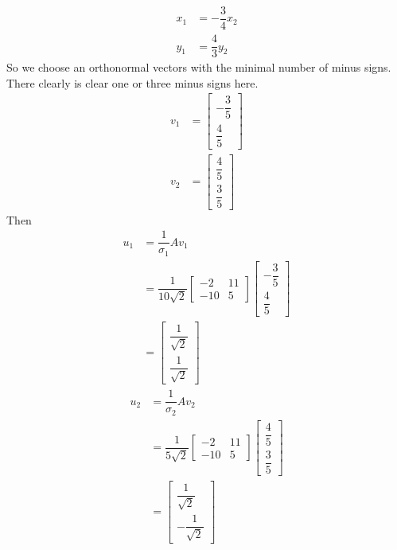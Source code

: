 \documentclass[a4paper,oneside]{book}
\numberwithin{equation}{chapter}
\begin{document}
\begin{enumerate}
\begin{align}
\label{1.7}
{x_1} &=  - \dfrac{3}{4}{x_2}\\
{y_1} &= \dfrac{4}{3}{y_2} \label{1.8}
\end{align}
So we choose an orthonormal vectors with the minimal number of minus signs. There clearly is clear one or three minus signs here.
\begin{align}
{v_1} &= \left[ {\begin{array}{*{20}{c}}
{ - \dfrac{3}{5}}\\
{\dfrac{4}{5}}
\end{array}} \right]\\
{v_2} &= \left[ {\begin{array}{*{20}{c}}
{\dfrac{4}{5}}\\
{\dfrac{3}{5}}
\end{array}} \right]
\end{align}
Then 
\begin{align}
{u_1} &= \dfrac{1}{{{\sigma _1}}}A{v_1}\\
& = \dfrac{1}{{{10 \sqrt 2}}}\left[ {\begin{array}{*{20}{c}}
{ - 2}&{11}\\
{ - 10}&5
\end{array}} \right]\left[ {\begin{array}{*{20}{c}}
{ - \dfrac{3}{5}}\\
{\dfrac{4}{5}}
\end{array}} \right]\\
 &= \left[ {\begin{array}{*{20}{c}}
{\dfrac{1}{{\sqrt 2 }}}\\
{\dfrac{1}{{\sqrt 2 }}}
\end{array}} \right]
\end{align}
\begin{align}
{u_2} &= \dfrac{1}{{{\sigma _2}}}A{v_2}\\
 &= \dfrac{1}{{{5 \sqrt 2}}}\left[ {\begin{array}{*{20}{c}}
{ - 2}&{11}\\
{ - 10}&5
\end{array}} \right]\left[ {\begin{array}{*{20}{c}}
{\dfrac{4}{5}}\\
{\dfrac{3}{5}}
\end{array}} \right]\\
 &= \left[ {\begin{array}{*{20}{c}}
{\dfrac{1}{{\sqrt 2 }}}\\
{ - \dfrac{1}{{\sqrt 2 }}}
\end{array}} \right]
\end{align}


\end{enumerate}
\end{document}
